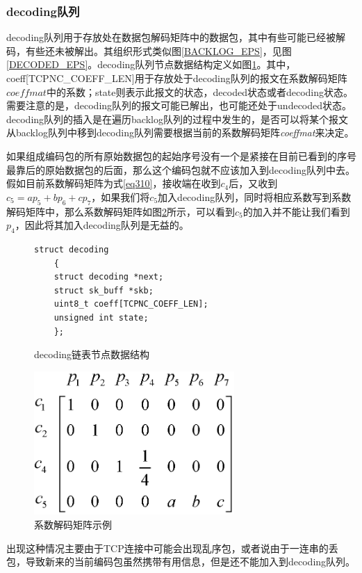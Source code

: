 \subsubsection{\textbf{decoding队列}}
decoding队列用于存放处在数据包解码矩阵中的数据包，其中有些可能已经被解码，有些还未被解出。其组织形式类似图\ref{BACKLOG_EPS}，见图\ref{DECODED_EPS}。decoding队列节点数据结构定义如图\ref{DECODING}。其中，coeff[TCPNC\_COEFF\_LEN]用于存放处于decoding队列的报文在系数解码矩阵$coeffmat$中的系数；state则表示此报文的状态，decoded状态或者decoding状态。需要注意的是，decoding队列的报文可能已解出，也可能还处于undecoded状态。decoding队列的插入是在遍历backlog队列的过程中发生的，是否可以将某个报文从backlog队列中移到decoding队列需要根据当前的系数解码矩阵\emph{coeffmat}来决定。
\par
如果组成编码包的所有原始数据包的起始序号没有一个是紧接在目前已看到的序号最靠后的原始数据包的后面，那么这个编码包就不应该加入到decoding队列中去。假如目前系数解码矩阵为式\ref{eq310}，接收端在收到$c_4$后，又收到$c_5=ap_{5}+bp_{6}+cp_{7}$，如果我们将$c_5$加入decoding队列，同时将相应系数写到系数解码矩阵中，那么系数解码矩阵如图\ref{IFADD_EPS}所示，可以看到$c_5$的加入并不能让我们看到$p_{4}$，因此将其加入decoding队列是无益的。
\begin{figure}[htbp]
	\begin{lstlisting}[language={[ANSI]C}]
	struct decoding
	{
	struct decoding *next;
	struct sk_buff *skb;		
	uint8_t coeff[TCPNC_COEFF_LEN];
	unsigned int state;
	};
	\end{lstlisting}
	\caption{decoding链表节点数据结构}
	\label{DECODING}
\end{figure}
\begin{figure}[htbp]
	\centering
	\includegraphics[width=3in]{figures/ifadd.eps}
	\caption{系数解码矩阵示例}
	\label{IFADD_EPS}
\end{figure}
出现这种情况主要由于TCP连接中可能会出现乱序包，或者说由于一连串的丢包，导致新来的当前编码包虽然携带有用信息，但是还不能加入到decoding队列。
